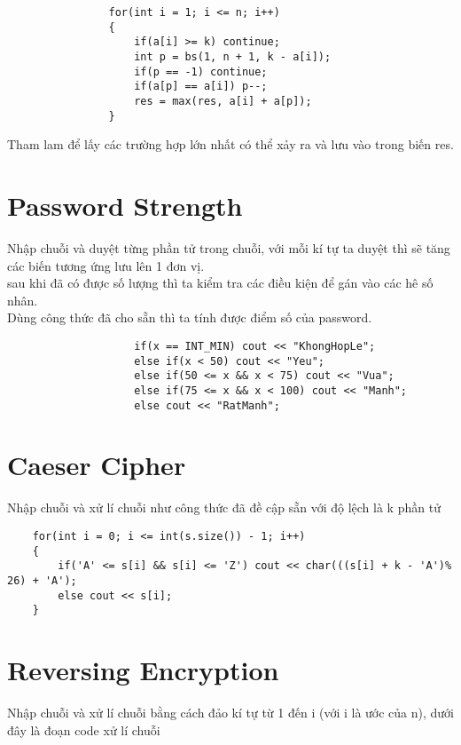 \documentclass{article}
\begin{document}
\begin{verbatim}
                for(int i = 1; i <= n; i++)
                {
                    if(a[i] >= k) continue;
                    int p = bs(1, n + 1, k - a[i]);
                    if(p == -1) continue;
                    if(a[p] == a[i]) p--;
                    res = max(res, a[i] + a[p]);
                }
\end{verbatim}
Tham lam để lấy các trường hợp lớn nhất có thể xảy ra và lưu vào trong biến res.

\section*{Password Strength}

Nhập chuỗi và duyệt từng phần tử trong chuỗi, với mỗi kí tự ta duyệt thì sẽ tăng các biến tương ứng lưu lên 1 đơn vị. \\
sau khi đã có được số lượng thì ta kiểm tra các điều kiện để gán vào các hê số nhân. \\
Dùng công thức đã cho sẵn thì ta tính được điểm số của password. 

\begin{verbatim}
                    if(x == INT_MIN) cout << "KhongHopLe";
                    else if(x < 50) cout << "Yeu";
                    else if(50 <= x && x < 75) cout << "Vua";
                    else if(75 <= x && x < 100) cout << "Manh";
                    else cout << "RatManh";
\end{verbatim}


\section*{Caeser Cipher}

Nhập chuỗi và xử lí chuỗi như công thức đã đề cập sẵn với độ lệch là k phần tử\\

\begin{verbatim}
    for(int i = 0; i <= int(s.size()) - 1; i++)
    {
        if('A' <= s[i] && s[i] <= 'Z') cout << char(((s[i] + k - 'A')% 26) + 'A');
        else cout << s[i];
    }
\end{verbatim}

\section*{Reversing Encryption}

Nhập chuỗi và xử lí chuỗi bằng cách đảo kí tự từ 1 đến i (với i là ước của n), dưới đây là đoạn code xử lí chuỗi \\ \\
\end{document}
